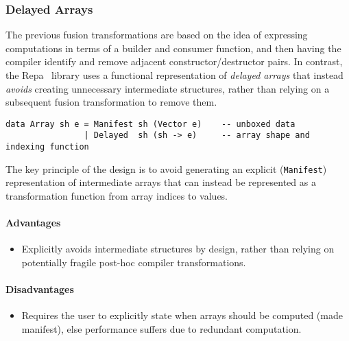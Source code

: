 \subsubsection{Delayed Arrays}

The previous fusion transformations are based on the idea of expressing
computations in terms of a builder and consumer function, and then having the
compiler identify and remove adjacent constructor/destructor pairs. In contrast,
the Repa~\cite{Keller:2010er} library uses a functional representation of
\emph{delayed arrays} that instead \emph{avoids}
creating unnecessary intermediate structures, rather than relying on a
subsequent fusion transformation to remove them.

\begin{lstlisting}[style=Haskell,numbers=none,caption={Repa-1 style array definition},label={lst:repa_arrays}]
data Array sh e = Manifest sh (Vector e)    -- unboxed data
                | Delayed  sh (sh -> e)     -- array shape and indexing function
\end{lstlisting}

The key principle of the design is to avoid generating an explicit
(\texttt{Manifest}) representation of intermediate arrays that can instead be
represented as a transformation function from array indices to values.


\paragraph{Advantages}
\begin{itemize}
    \item Explicitly avoids intermediate structures by design, rather than
        relying on potentially fragile post-hoc compiler transformations.
\end{itemize}

\paragraph{Disadvantages}
\begin{itemize}
    \item Requires the user to explicitly state when arrays should be computed
        (made manifest), else performance suffers due to redundant computation.
\end{itemize}

